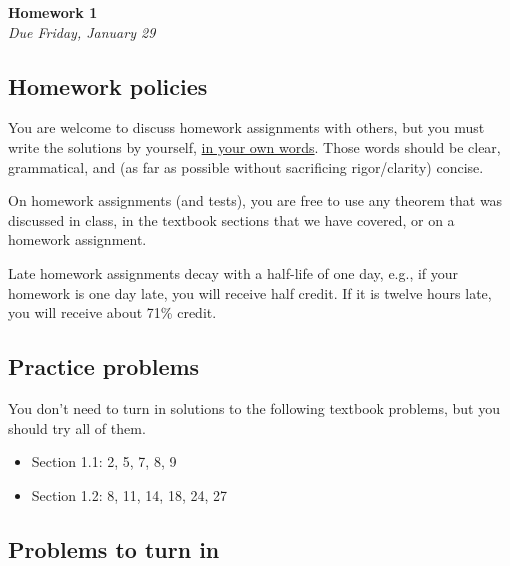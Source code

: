 \documentclass[12pt,reqno]{article}
\begin{document}
\begin{center}
\textbf{Homework 1} \\
\textit{Due Friday, January 29}
\end{center}

\subsection*{Homework policies}

You are welcome to discuss homework assignments with others, but you must write the solutions by yourself, \underline{in your own words}. Those words should be clear, grammatical, and (as far as possible without sacrificing rigor/clarity) concise.

On homework assignments (and tests), you are free to use any theorem that was discussed in class, in the textbook sections that we have covered, or on a homework assignment. 

Late homework assignments decay with a half-life of one day, e.g., if your homework is one day late, you will receive half credit. If it is twelve hours late, you will receive about 71\% credit.

\subsection*{Practice problems}

You don't need to turn in solutions to the following textbook problems, but you should try all of them. 

\begin{itemize}
\item Section 1.1: 2, 5, 7, 8, 9
\item Section 1.2: 8, 11, 14, 18, 24, 27
\end{itemize}

\subsection*{Problems to turn in}
\end{document}
